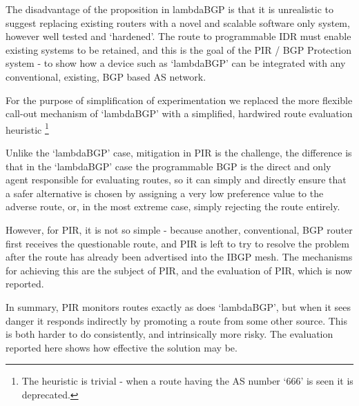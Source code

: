 The disadvantage of the proposition in lambdaBGP is that it is unrealistic to suggest replacing existing routers with a novel and scalable software only system, however well tested and `hardened'.  The route to programmable IDR must enable existing systems to be retained, and   this is the goal of the PIR / BGP Protection system - to show how a device such as `lambdaBGP' can be integrated with any conventional, existing, BGP based AS network.

For the purpose of simplification of experimentation we replaced the more flexible call-out mechanism of `lambdaBGP' with a simplified, hardwired route evaluation heuristic \footnote{The heuristic is trivial - when a route having the AS number `666' is seen it is deprecated.}

Unlike the `lambdaBGP' case, mitigation in PIR is the challenge, the difference is that in the `lambdaBGP' case the programmable BGP is the direct and only agent responsible for evaluating routes, so it can simply and directly ensure that a safer alternative is chosen by assigning a very low preference value to the adverse route, or, in the most extreme case, simply rejecting the route entirely.

However, for PIR, it is not so simple - because another, conventional, BGP router first receives the questionable route, and PIR is left to try to resolve the problem after the route has already been advertised into the IBGP mesh.  The mechanisms for achieving this are the subject of PIR, and the evaluation of PIR, which is now reported.

In summary, PIR monitors routes exactly as does `lambdaBGP', but when it sees danger it responds indirectly by promoting a route from some other source.  This is both harder to do consistently, and intrinsically more risky.  The evaluation reported here shows how effective the solution may be.